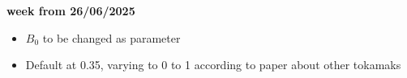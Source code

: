 \documentclass{article}
\begin{document}
\begin{arrowlist}
    \item \textbf{week from 26/06/2025}
        \begin{itemize}
            \item $B_0$ to be changed as parameter
            \item Default at 0.35, varying to 0 to 1 according to paper about other tokamaks
        \end{itemize}
    
\end{arrowlist}



\nocite{*}
\printbibliography[title={References}]
\end{document}
